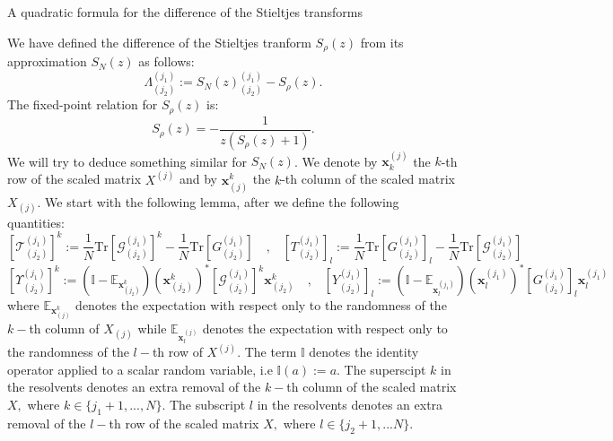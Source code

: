 \documentclass[11pt, a4paper, oneside]{book}
\numberwithin{equation}{chapter}
\newcommand{\E}{\mathbb E}
\newcommand{\Tr}{\mathrm{Tr}}
\begin{document}
\begin{section}{A quadratic formula for the difference of the Stieltjes transforms}

We have defined the difference of the Stieltjes tranform $S_{\rho}(z)$ from its approximation $S_N(z) $ as follows:
%
\begin{equation} \label{lambda}
    \Lambda_{(j_2)}^{(j_1)} := S_N(z)^{(j_1)}_{ (j_2)} - S_{\rho}(z).
\end{equation}
%
The fixed-point relation for $S_{\rho}(z)$ is:
%
\begin{equation} \label{equation-S}
  S_{\rho}(z) = - \frac{1}{z (S_{\rho}(z) +1)}  .
\end{equation}
%
We will try to deduce something similar for $S_N(z)$. We denote by $\mathbf{x}_k^{(j)}$ the $k$-th row of the scaled matrix $X^{(j)}$ and by $\mathbf{x}_{(j)}^k$ the $k$-th column of the scaled matrix $X_{(j)}.$ We start with the following lemma, after we define the following quantities:
%
\begin{equation} \label{T-T}
\left [\mathcal{T}_{(j_2)}^{(j_1)} \right ]^k := \frac{1}{N} \Tr \left [ \mathcal{G}_{(j_2)}^{(j_1)} \right ]^k - \frac{1}{N}\Tr \left [ G_{(j_2)}^{(j_1)} \right ] \quad \text{,} \quad \left [T_{(j_2)}^{(j_1)} \right ]_l := \frac{1}{N} \Tr \left [ G_{(j_2)}^{(j_1)} \right ]_l - \frac{1}{N}\Tr \left [ \mathcal{G}_{(j_2)}^{(j_1)} \right ]
\end{equation}
%
\begin{equation} \label{Y-Y}
\left [\Upsilon_{(j_2)}^{(j_1)} \right ]^k := ( \mathbb{I} - \E_{\textbf{x}_{(j_2)}^k}) (\textbf{x}_{(j_2)}^k)^* \left [\mathcal{G}_{(j_2)}^{(j_1)} \right ]^k \textbf{x}_{(j_2)}^k \quad \text{,} \quad \left [Y_{(j_2)}^{(j_1)} \right ]_l := ( \mathbb{I} - \E_{\textbf{x}_l^{(j_1)}}) (\textbf{x}_l^{(j_1)})^* \left [G_{(j_2)}^{(j_1)} \right ]_l \textbf{x}_l^{(j_1)}
\end{equation}
%
where $\E_{\textbf{x}^k_{(j)}}$ denotes the expectation with respect only to the randomness of the $k-$th column of $X_{(j)}$ while $\E_{\textbf{x}_l^{(j)}}$ denotes the expectation with respect only to the randomness of the $l-$th row of $X^{(j)}$. The term $\mathbb{I}$ denotes the identity operator applied to a scalar random variable, i.e $\mathbb{I}(a) := a$. The superscipt $k$ in the resolvents denotes an extra removal of the $k-$th column of the scaled matrix $X,$ where $k\in \{j_1+1,...,N \}$. The subscript $l$ in the resolvents denotes an extra removal of the $l-$th row of the scaled matrix $X,$ where $l \in \{j_2+1,...N\}.$

\end{section}
\end{document}
